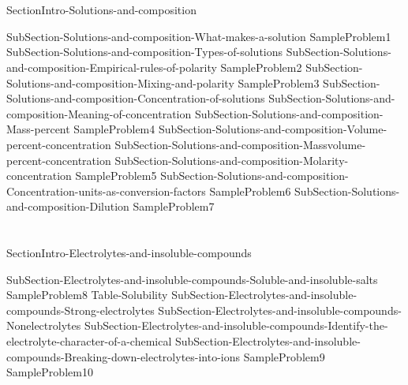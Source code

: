 \documentclass[main.tex]{subfiles} %
\begin{document}
\section{\color{blue!30!black}{Solutions and composition}}
{SectionIntro-Solutions-and-composition}
\sloppy\begin{description}
{SubSection-Solutions-and-composition-What-makes-a-solution}
{SampleProblem1}
{SubSection-Solutions-and-composition-Types-of-solutions}
 \hspace{-0cm}{Figure-Dissolution}
{SubSection-Solutions-and-composition-Empirical-rules-of-polarity}
{SampleProblem2}
{SubSection-Solutions-and-composition-Mixing-and-polarity}
 \hspace{2cm}{Table-Polarity-and-mixing}	
{SampleProblem3}
{SubSection-Solutions-and-composition-Concentration-of-solutions}
{SubSection-Solutions-and-composition-Meaning-of-concentration}
{SubSection-Solutions-and-composition-Mass-percent}
{SampleProblem4}
{SubSection-Solutions-and-composition-Volume-percent-concentration}
{SubSection-Solutions-and-composition-Massvolume-percent-concentration}
{SubSection-Solutions-and-composition-Molarity-concentration}
{SampleProblem5}
{SubSection-Solutions-and-composition-Concentration-units-as-conversion-factors}
{SampleProblem6}
{SubSection-Solutions-and-composition-Dilution}
{SampleProblem7}
\end{description}
\section{\color{blue!30!black}{Electrolytes and insoluble compounds}}
{SectionIntro-Electrolytes-and-insoluble-compounds}
\sloppy \begin{description}
{SubSection-Electrolytes-and-insoluble-compounds-Soluble-and-insoluble-salts}
{SampleProblem8}
{Table-Solubility}
{SubSection-Electrolytes-and-insoluble-compounds-Strong-electrolytes}
{SubSection-Electrolytes-and-insoluble-compounds-Nonelectrolytes}
{SubSection-Electrolytes-and-insoluble-compounds-Identify-the-electrolyte-character-of-a-chemical}
{SubSection-Electrolytes-and-insoluble-compounds-Breaking-down-electrolytes-into-ions}
{SampleProblem9}
 \hspace{-5cm}{Table-Electrolytes	}	
{SampleProblem10}
\end{description}
\end{document}

